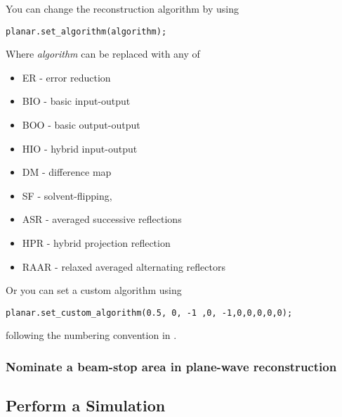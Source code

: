 \documentclass[]{nadia}
\begin{document}
You can change the reconstruction algorithm by using
\begin{verbatim}
planar.set_algorithm(algorithm);
\end{verbatim}

Where \emph{algorithm} can be replaced with any of 
\begin{itemize}
\item ER - error reduction
\item BIO - basic input-output
\item BOO - basic output-output
\item HIO - hybrid input-output
\item DM - difference map
\item SF - solvent-flipping,
\item ASR - averaged successive reflections
\item HPR - hybrid projection reflection
\item RAAR - relaxed averaged alternating reflectors
\end{itemize}
Or you can set a custom algorithm using 

\begin{verbatim}
planar.set_custom_algorithm(0.5, 0, -1 ,0, -1,0,0,0,0,0);
\end{verbatim}

following the numbering convention in \cite{quiney2010coherent}.\\

\subsubsection{Nominate a beam-stop area in plane-wave reconstruction}



\subsection{Perform a Simulation}
\end{document}

